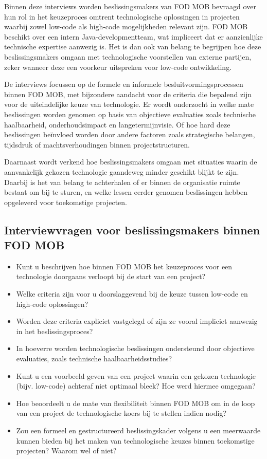 Binnen deze interviews worden beslissingsmakers van \gls{FOD MOB} bevraagd over hun rol in het keuzeproces omtrent technologische oplossingen in projecten waarbij zowel low-code als high-code mogelijkheden relevant zijn. \gls{FOD MOB} beschikt over een intern Java-developmentteam, wat impliceert dat er aanzienlijke technische expertise aanwezig is. Het is dan ook van belang te begrijpen hoe deze beslissingsmakers omgaan met technologische voorstellen van externe partijen, zeker wanneer deze een voorkeur uitspreken voor low-code ontwikkeling.

De interviews focussen op de formele en informele besluitvormingsprocessen binnen \gls{FOD MOB}, met bijzondere aandacht voor de criteria die bepalend zijn voor de uiteindelijke keuze van technologie. Er wordt onderzocht in welke mate beslissingen worden genomen op basis van objectieve evaluaties zoals technische haalbaarheid, onderhoudsimpact en langetermijnvisie. Of hoe hard deze beslissingen beïnvloed worden door andere factoren zoals strategische belangen, tijdsdruk of machtsverhoudingen binnen projectstructuren.

Daarnaast wordt verkend hoe beslissingsmakers omgaan met situaties waarin de aanvankelijk gekozen technologie gaandeweg minder geschikt blijkt te zijn. Daarbij is het van belang te achterhalen of er binnen de organisatie ruimte bestaat om bij te sturen, en welke lessen eerder genomen beslissingen hebben opgeleverd voor toekomstige projecten.

\subsection{Interviewvragen voor beslissingsmakers binnen \gls{FOD MOB}}
\begin{itemize}
    \item Kunt u beschrijven hoe binnen \gls{FOD MOB} het keuzeproces voor een technologie doorgaans verloopt bij de start van een project?
    \item Welke criteria zijn voor u doorslaggevend bij de keuze tussen low-code en high-code oplossingen?
    \item Worden deze criteria expliciet vastgelegd of zijn ze vooral impliciet aanwezig in het beslissingsproces?
    \item In hoeverre worden technologische beslissingen ondersteund door objectieve evaluaties, zoals technische haalbaarheidsstudies?
    \item Kunt u een voorbeeld geven van een project waarin een gekozen technologie (bijv. low-code) achteraf niet optimaal bleek? Hoe werd hiermee omgegaan?
    \item Hoe beoordeelt u de mate van flexibiliteit binnen \gls{FOD MOB} om in de loop van een project de technologische koers bij te stellen indien nodig?
    \item Zou een formeel en gestructureerd beslissingskader volgens u een meerwaarde kunnen bieden bij het maken van technologische keuzes binnen toekomstige projecten? Waarom wel of niet?
\end{itemize}

